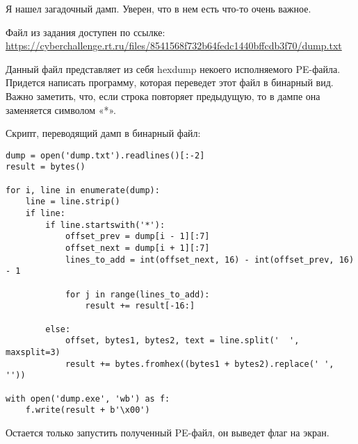 
Я нашел загадочный дамп. Уверен, что в нем есть что-то очень важное. 

Файл из задания доступен по ссылке: \url{https://cyberchallenge.rt.ru/files/8541568f732b64fedc1440bffcdb3f70/dump.txt}

\solutionSection

Данный файл представляет из себя hexdump некоего исполняемого PE-файла. Придется написать программу, которая переведет этот файл в бинарный вид. Важно заметить, что, если строка повторяет предыдущую, то в дампе она заменяется символом «*».

Скрипт, переводящий дамп в бинарный файл:

\begin{verbatim}
dump = open('dump.txt').readlines()[:-2]
result = bytes()

for i, line in enumerate(dump):
    line = line.strip()
    if line:
        if line.startswith('*'):
            offset_prev = dump[i - 1][:7]
            offset_next = dump[i + 1][:7]
            lines_to_add = int(offset_next, 16) - int(offset_prev, 16) - 1

            for j in range(lines_to_add):
                result += result[-16:]
            
        else:
            offset, bytes1, bytes2, text = line.split('  ', maxsplit=3)
            result += bytes.fromhex((bytes1 + bytes2).replace(' ', ''))

with open('dump.exe', 'wb') as f:
    f.write(result + b'\x00')
\end{verbatim}

Остается только запустить полученный PE-файл, он выведет флаг на экран.

